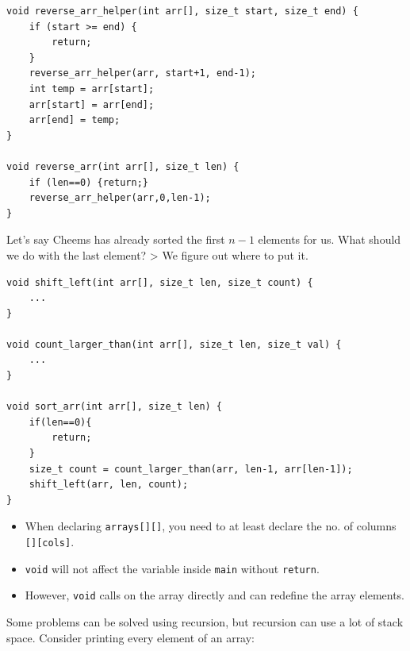\documentclass[11pt,a4paper]{article}
\begin{document}
\begin{lstlisting}[style=cscode]
void reverse_arr_helper(int arr[], size_t start, size_t end) {
    if (start >= end) {
        return;
    }
    reverse_arr_helper(arr, start+1, end-1);
    int temp = arr[start];
    arr[start] = arr[end];
    arr[end] = temp;
}

void reverse_arr(int arr[], size_t len) {
    if (len==0) {return;}
    reverse_arr_helper(arr,0,len-1);
}
\end{lstlisting}

\label{example-sort-an-array}
\hypertarget{example-sort-an-array}{}

Let's say Cheems has already sorted the first \(n-1\) elements for us. What should we do with the last element? \textgreater{} We figure out where to put it.

\begin{lstlisting}[style=cscode]
void shift_left(int arr[], size_t len, size_t count) {
    ...
}

void count_larger_than(int arr[], size_t len, size_t val) {
    ...
}

void sort_arr(int arr[], size_t len) {
    if(len==0){
        return;
    }
    size_t count = count_larger_than(arr, len-1, arr[len-1]);
    shift_left(arr, len, count);
}

\end{lstlisting}

\label{3x-lab}
\hypertarget{3x-lab}{}

\begin{itemize}
\item
  When declaring \texttt{arrays{[}{]}{[}{]}}, you need to at least declare the no. of columns \texttt{{[}{]}{[}cols{]}}.
\item
  \texttt{void} will not affect the variable inside \texttt{main} without \texttt{return}.
\item
  However, \texttt{void} calls on the array directly and can redefine the array elements.
\end{itemize}

\label{l4-loops}
\hypertarget{l4-loops}{}

\label{41-while-loops-and-for-loops}
\hypertarget{41-while-loops-and-for-loops}{}

\label{why-loops}
\hypertarget{why-loops}{}

Some problems can be solved using recursion, but recursion can use a lot of stack space. Consider printing every element of an array:
\end{document}
